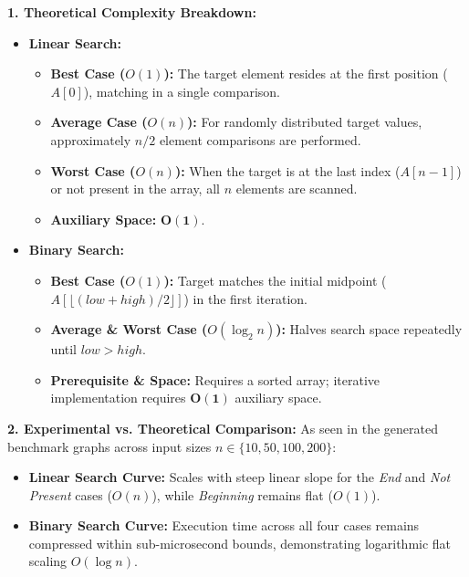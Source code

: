 \documentclass[12pt]{article}
\begin{document}
\textbf{1. Theoretical Complexity Breakdown:}
\begin{itemize}
    \item \textbf{Linear Search:}
    \begin{itemize}
        \item \textbf{Best Case ($O(1)$):} The target element resides at the first position ($A[0]$), matching in a single comparison.
        \item \textbf{Average Case ($O(n)$):} For randomly distributed target values, approximately $n / 2$ element comparisons are performed.
        \item \textbf{Worst Case ($O(n)$):} When the target is at the last index ($A[n-1]$) or not present in the array, all $n$ elements are scanned.
        \item \textbf{Auxiliary Space:} $\mathbf{O(1)}$.
    \end{itemize}
    \item \textbf{Binary Search:}
    \begin{itemize}
        \item \textbf{Best Case ($O(1)$):} Target matches the initial midpoint ($A[\lfloor (low+high)/2 \rfloor]$) in the first iteration.
        \item \textbf{Average \& Worst Case ($O(\log_2 n)$):} Halves search space repeatedly until $low > high$.
        \item \textbf{Prerequisite \& Space:} Requires a sorted array; iterative implementation requires $\mathbf{O(1)}$ auxiliary space.
    \end{itemize}
\end{itemize}

\textbf{2. Experimental vs. Theoretical Comparison:}
As seen in the generated benchmark graphs across input sizes $n \in \{10, 50, 100, 200\}$:
\begin{itemize}
    \item \textbf{Linear Search Curve:} Scales with steep linear slope for the \textit{End} and \textit{Not Present} cases ($O(n)$), while \textit{Beginning} remains flat ($O(1)$).
    \item \textbf{Binary Search Curve:} Execution time across all four cases remains compressed within sub-microsecond bounds, demonstrating logarithmic flat scaling $O(\log n)$.
\end{itemize}

\newpage

\end{document}
